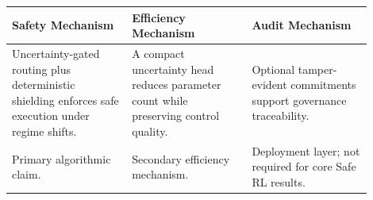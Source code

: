 \footnotesize
\setlength{\tabcolsep}{4pt}
\begin{tabular}{p{0.30\linewidth}p{0.30\linewidth}p{0.30\linewidth}}
\toprule
\textbf{Safety Mechanism} & \textbf{Efficiency Mechanism} & \textbf{Audit Mechanism} \\
\midrule
Uncertainty-gated routing plus deterministic shielding enforces safe execution under regime shifts. & A compact uncertainty head reduces parameter count while preserving control quality. & Optional tamper-evident commitments support governance traceability. \\
\midrule
Primary algorithmic claim. & Secondary efficiency mechanism. & Deployment layer; not required for core Safe RL results. \\
\bottomrule
\end{tabular}
